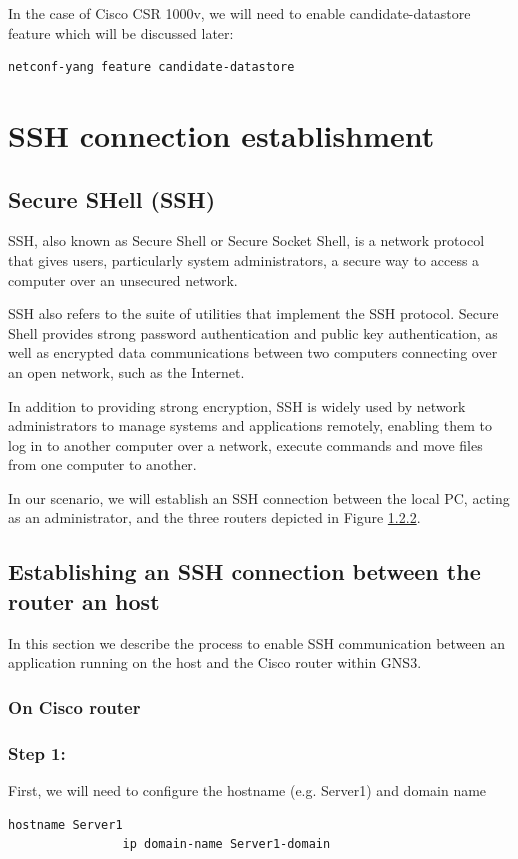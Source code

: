 In the case of Cisco CSR 1000v, we will need to enable candidate-datastore feature which will be discussed later:


\begin{lstlisting}[style=cliStyle,  backgroundcolor=\color{codebackground}]
                netconf-yang feature candidate-datastore
\end{lstlisting}

\section{SSH connection establishment}
\subsection{Secure SHell (SSH)}
SSH, also known as Secure Shell or Secure Socket Shell, is a network protocol that gives users, particularly system administrators, a secure way to access a computer over an unsecured network.

SSH also refers to the suite of utilities that implement the SSH protocol. Secure Shell provides strong password authentication and public key authentication, as well as encrypted data communications between two computers connecting over an open network, such as the Internet.

In addition to providing strong encryption, SSH is widely used by network administrators to manage systems and applications remotely, enabling them to log in to another computer over a network, execute commands and move files from one computer to another.

In our scenario, we will establish an SSH connection between the local PC, acting as an administrator, and the three routers depicted in Figure \ref{}.

\subsection{Establishing an SSH connection between the router an host}
In this section we describe the process to enable SSH communication between an application running on the host and the Cisco router within GNS3.

\subsubsection{On Cisco router}

\subsubsection{Step 1:}
First, we will need to configure the hostname (e.g. Server1) and domain name 
\begin{lstlisting}[style=cliStyle,  backgroundcolor=\color{codebackground}]
                hostname Server1
                ip domain-name Server1-domain
\end{lstlisting}

